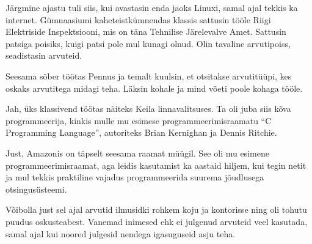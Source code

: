 Järgmine ajastu tuli siis, kui avastasin enda jaoks 
Linuxi, samal ajal tekkis ka internet. Gümnaasiumi 
kaheteistkümnendas klassis sattusin tööle Riigi Elektriside 
Inspektsiooni, mis on täna Tehnilise Järelevalve Amet. Sattusin patsiga poisiks, kuigi patsi pole mul
kunagi olnud. Olin tavaline arvutipoiss, seadistasin arvuteid.


Seesama sõber töötas Pennus ja temalt kuulsin,
et otsitakse arvutitüüpi, kes oskaks arvutitega midagi teha. Läksin 
kohale ja mind võeti poole kohaga tööle.


Jah, üks klassivend töötas näiteks Keila linnavalitsuses. Ta oli juba siis kõva programmeerija, kinkis mulle 
mu esimese programmeerimisraamatu \enquote{C Programming Language}, autoriteks Brian Kernighan ja Dennis Ritchie.


Just, Amazonis on täpselt seesama raamat müügil. 
See oli mu esimene programmeerimisraamat, aga leidis kasutamist ka
aastaid hiljem, kui tegin netit ja mul tekkis praktiline 
vajadus programmeerida suurema jõudlusega otsingusüsteemi.


Võibolla just sel ajal arvutid ilmusidki rohkem koju ja 
kontorisse ning oli tohutu puudus oskusteabest. Vanemad 
inimesed ehk ei julgenud arvuteid veel kasutada, samal ajal kui noored julgesid nendega 
igasuguseid asju teha.



